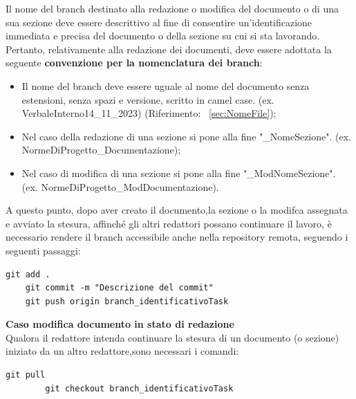\documentclass{article}
\begin{document}
    Il nome del branch destinato alla redazione o modifica del documento o di una sua sezione deve essere descrittivo al fine di consentire un'identificazione immediata e precisa del documento o della sezione su cui si sta lavorando. Pertanto, relativamente alla redazione dei documenti, deve essere adottata la seguente \textbf{convenzione per la nomenclatura dei branch}:
\begin{itemize}
    \item  Il nome del branch deve essere uguale al nome del documento senza estensioni, senza spazi e versione, scritto in camel case. (ex. VerbaleInterno14\_11\_2023) (Riferimento: ~\ref{sec:NomeFile});
    \item  Nel caso della redazione di una sezione si pone alla fine "\_NomeSezione". (ex. NormeDiProgetto\_Documentazione);
    \item Nel caso di modifica di una sezione si pone alla fine "\_ModNomeSezione". (ex. NormeDiProgetto\_ModDocumentazione).
\end{itemize}

A questo punto, dopo aver creato il documento,la sezione o la modifca assegnata e avviato la stesura, affinché gli altri redattori possano continuare il lavoro, è necessario rendere il branch accessibile anche nella repository remota, seguendo i seguenti passaggi:
\begin{lstlisting}[style=code]
    git add .
    git commit -m "Descrizione del commit"
    git push origin branch_identificativoTask
        \end{lstlisting}




\textbf{Caso modifica documento in stato di redazione}\\
Qualora il redattore intenda continuare la stesura di un documento (o sezione) iniziato da un altro redattore,sono necessari i comandi:

\begin{lstlisting}[style=code]
        git pull
        git checkout branch_identificativoTask

        \end{lstlisting}
\end{document}

